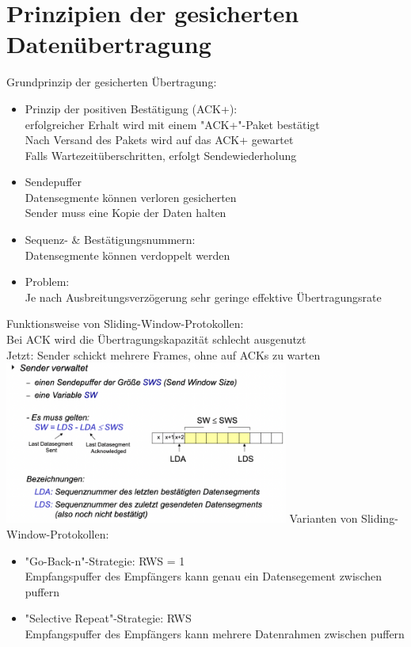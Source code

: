 \documentclass{scrreprt}
\begin{document}
\section{Prinzipien der gesicherten Datenübertragung}
Grundprinzip der gesicherten Übertragung:
\begin{itemize}
	\item Prinzip der positiven Bestätigung (ACK+):
	\\erfolgreicher Erhalt wird mit einem "ACK+"-Paket bestätigt
	\\Nach Versand des Pakets wird auf das ACK+ gewartet
	\\Falls Wartezeitüberschritten, erfolgt Sendewiederholung
	\item Sendepuffer
	\\Datensegmente können verloren gesicherten
	\\Sender muss eine Kopie der Daten halten
	\item Sequenz- \& Bestätigungsnummern:
	\\Datensegmente können verdoppelt werden
	\item Problem:
	\\Je nach Ausbreitungsverzögerung sehr geringe effektive Übertragungsrate
\end{itemize}
Funktionsweise von Sliding-Window-Protokollen:
\\Bei ACK wird die Übertragungskapazität schlecht ausgenutzt
\\Jetzt: Sender schickt mehrere Frames, ohne auf ACKs zu warten
\\\includegraphics[width=0.70\textwidth]{"graphics/sliding-window"}
Varianten von Sliding-Window-Protokollen:
\begin{itemize}
	\item "Go-Back-n"-Strategie: RWS = 1
	\\Empfangspuffer des Empfängers kann genau ein Datensegement zwischen puffern
	\item "Selective Repeat"-Strategie: RWS 
	\\Empfangspuffer des Empfängers kann mehrere Datenrahmen zwischen puffern
\end{itemize}
\end{document}
